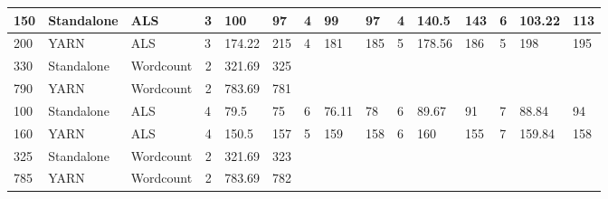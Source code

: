 \documentclass[conference]{IEEEtran}
\begin{document}
\begin{table*}[!ht]
{{\begin{tabular}{|l|l|l|c|l|l|l|l|l|l|l|l|l|l|l}
150                  & Standalone                                 & ALS                                       & \multicolumn{1}{l|}{3}  & 100       & 97        & 4                      & 99        & 97        & 4  & 140.5     & 143       & 6  & 103.22    & \multicolumn{1}{l|}{113}       \\ \hline
200                  & YARN                                       & ALS                                       & \multicolumn{1}{l|}{3}  & 174.22    & 215       & 4                      & 181       & 185       & 5  & 178.56    & 186       & 5  & 198       & \multicolumn{1}{l|}{195}       \\ \hline
330                  & Standalone                                 & Wordcount                                     & 2                       & 321.69    & 325       & \multicolumn{9}{l|}{\multirow{2}{*}{}}                                                                                        \\ \cline{1-6}
790                  & YARN                                       & Wordcount                                     & 2                       & 783.69    & 781       & \multicolumn{9}{l|}{}                                                                                                         \\ \hline
100                  & Standalone                                 & ALS                                       & \multicolumn{1}{l|}{4}  & 79.5      & 75        & 6                      & 76.11     & 78        & 6  & 89.67     & 91        & 7  & 88.84     & \multicolumn{1}{l|}{94}        \\ \hline
160                  & YARN                                       & ALS                                       & 4                       & 150.5     & 157       & 5                      & 159       & 158       & 6  & 160       & 155       & 7  & 159.84    & \multicolumn{1}{l|}{158}       \\ \hline
325                  & Standalone                                 & Wordcount                                     & 2                       & 321.69    & 323       & \multicolumn{9}{l|}{\multirow{2}{*}{}}                                                                                        \\ \cline{1-6}
785                  & YARN                                       & Wordcount                                     & 2                       & 783.69    & 782       & \multicolumn{9}{l|}{}                                                                                                         \\ \hline

\end{tabular}}}
\end{table*}
\end{document}
